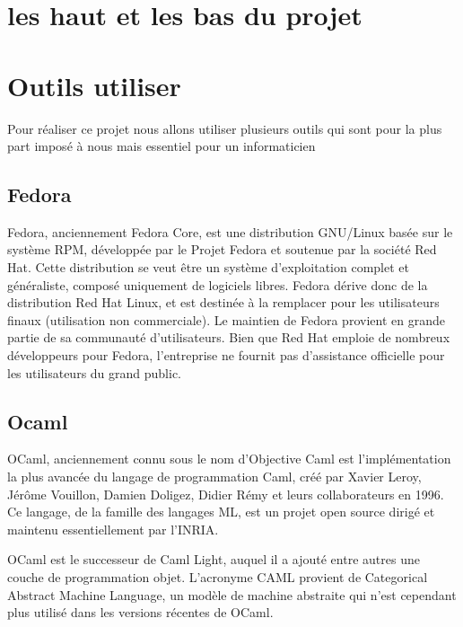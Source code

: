 \documentclass[12pt, a4paper]{report}
\begin{document}
\newpage

\chapter{les haut et les bas du projet}




\newpage


\chapter{Outils utiliser}

Pour réaliser ce projet nous allons utiliser plusieurs outils qui sont pour la plus part imposé à nous mais essentiel pour un informaticien

\section {Fedora}

Fedora, anciennement Fedora Core, est une distribution GNU/Linux basée sur le système RPM, développée par le Projet Fedora et soutenue par la société Red Hat. Cette distribution se veut être un système d'exploitation complet et généraliste, composé uniquement de logiciels libres. Fedora dérive donc de la distribution Red Hat Linux, et est destinée à la remplacer pour les utilisateurs finaux (utilisation non commerciale). Le maintien de Fedora provient en grande partie de sa communauté d'utilisateurs. Bien que Red Hat emploie de nombreux développeurs pour Fedora, l'entreprise ne fournit pas d'assistance officielle pour les utilisateurs du grand public.

\section {Ocaml}

\par OCaml, anciennement connu sous le nom d'Objective Caml est l'implémentation la plus avancée du langage de programmation Caml, créé par Xavier Leroy, Jérôme Vouillon, Damien Doligez, Didier Rémy et leurs collaborateurs en 1996. Ce langage, de la famille des langages ML, est un projet open source dirigé et maintenu essentiellement par l'INRIA.

\par OCaml est le successeur de Caml Light, auquel il a ajouté entre autres une couche de programmation objet. L'acronyme CAML provient de Categorical Abstract Machine Language, un modèle de machine abstraite qui n'est cependant plus utilisé dans les versions récentes de OCaml.
\end{document}
